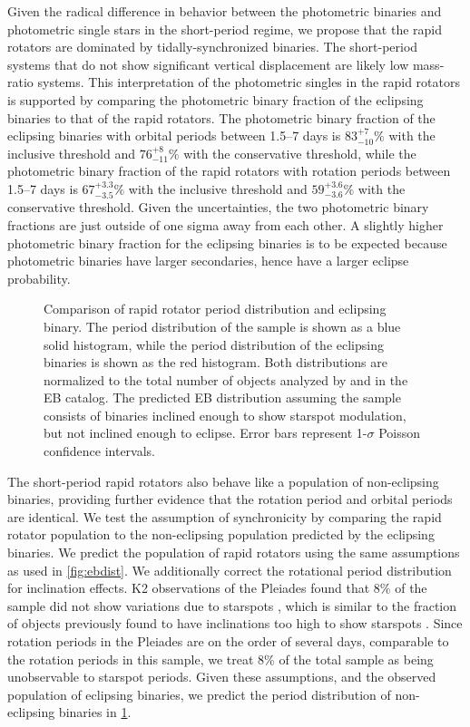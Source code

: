 \documentclass[manuscript]{aastex6}
\begin{document}
Given the radical difference in behavior between the photometric binaries and
photometric single stars in the short-period regime, we propose that the 
rapid rotators are dominated by tidally-synchronized binaries. The 
short-period systems that do not show significant vertical displacement are 
likely low mass-ratio systems. This interpretation of the photometric singles 
in the rapid rotators is supported by comparing the photometric binary 
fraction of the eclipsing binaries to that of the rapid rotators. The 
photometric binary fraction of the eclipsing binaries with orbital periods 
between 1.5--7 days is \(83^{+7}_{-10}\%\) with the inclusive threshold and 
\(76^{+8}_{-11}\%\) with the conservative threshold, while the photometric 
binary fraction of the rapid rotators with rotation periods between 1.5--7
days is \(67^{+3.3}_{-3.5}\%\) with the inclusive threshold and
\(59^{+3.6}_{-3.6}\%\) with the conservative threshold.  Given the
uncertainties, the two photometric binary fractions are just outside of one 
sigma away from each other. A slightly higher photometric binary fraction for
the eclipsing binaries is to be expected because photometric binaries have
larger secondaries, hence have a larger eclipse probability.

\begin{figure}[htb]
    \centering
    \caption{Comparison of rapid rotator period distribution and eclipsing
    binary. The period distribution of the \citet{McQuillan14} sample is shown
as a blue solid histogram, while the period distribution of the eclipsing binaries
is shown as the red histogram. Both distributions are normalized to the total
number of objects analyzed by \citet{McQuillan14} and in the EB catalog. The predicted EB 
distribution assuming the \citet{McQuillan14} sample consists of binaries 
inclined enough to show starspot modulation, but not inclined enough to eclipse. 
Error bars represent 1-\(\sigma\) Poisson confidence 
intervals.}\label{fig:eclipseprob}
\end{figure}

The short-period rapid rotators also behave like a population of non-eclipsing
binaries, providing further evidence that the rotation period and orbital
periods are identical. We test the assumption of synchronicity by comparing the
rapid rotator population to the non-eclipsing population predicted by the
eclipsing binaries. We predict the population of rapid rotators using the same
assumptions as used in \cref{fig:ebdist}. We additionally correct the rotational 
period distribution for inclination effects. K2 observations of the Pleiades 
found that 8\% of the sample did not show variations due to starspots 
\citep{Rebull17}, which is similar to the fraction of objects previously found 
to have inclinations too high to show starspots \citep{Jackson10}. Since 
rotation periods in the Pleiades are on the order of several days, comparable to 
the rotation periods in this sample, we treat 8\% of the total sample as being 
unobservable to starspot periods. Given these assumptions, and the observed 
population of eclipsing binaries, we predict the period distribution of 
non-eclipsing binaries in \cref{fig:eclipseprob}. 
\end{document}
